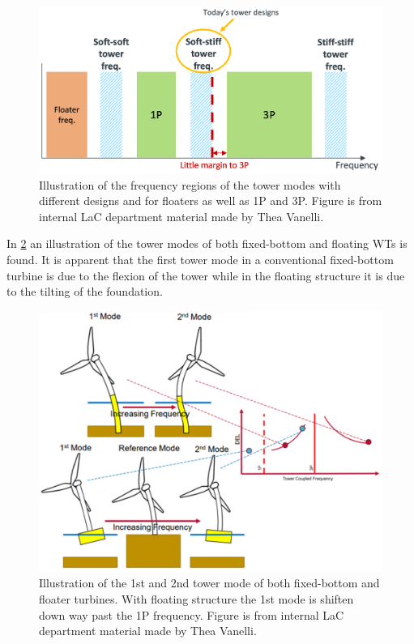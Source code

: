 \begin{figure}[ht]
	\centering
	\includegraphics[width=0.7\linewidth]{Graphics/1Pand3PvsTwrStiff.PNG}
	\caption{Illustration of the frequency regions of the tower modes with different designs and for floaters as well as 1P and 3P. Figure is from internal LaC department material made by Thea Vanelli.}
	\label{fig:1p_and3p}
\end{figure}
In \cref{fig:eigen_and_1p3p} an illustration of the tower modes of both fixed-bottom and floating WTs is found. It is apparent that the first tower mode in a conventional fixed-bottom turbine is due to the flexion of the tower while in the floating structure it is due to the tilting of the foundation.
\begin{figure}[ht]
	\centering
	\includegraphics[width=0.7\linewidth]{Graphics/1P3PandEigenFloater.png}
	\caption{Illustration of the 1st and 2nd tower mode of both fixed-bottom and floater turbines. With floating structure the 1st mode is shiften down way past the 1P frequency. Figure is from internal LaC department material made by Thea Vanelli.}
	\label{fig:eigen_and_1p3p}
\end{figure}

\newpage
